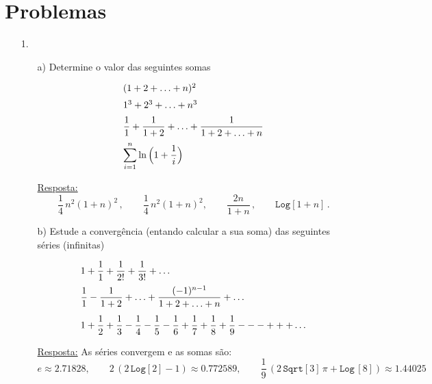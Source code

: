\documentclass[11pt]{article}
\begin{document}
  \section{Problemas}   
  \begin{itemize}
  
  \item[1.]       \begin{itemize}
  
  \item[a)]  Determine o valor das seguintes  somas 
  
  \[\begin{array}{l}
    (1+2+\ldots+n)^2\vspace{2mm}\\
    1^3+2^3+\ldots+n^3\vspace{2mm}\\
\displaystyle \frac{1}{1}+\frac{1}{1+2}+\ldots + \frac{1}{1+2+\ldots +n} 
\vspace{2mm}\\
\displaystyle  \sum_{i=1}^n \ln \Big( 1+\frac{1}{i}\Big)
\end{array}  \]

\underline{Resposta:}
\[
\frac{1}{4} \, n^2 (1 + n)^2\, , \qquad \frac{1}{4}\, n^2 (1 + n)^2, \qquad \frac{2 n}{1 + n}\, , \qquad  \texttt{Log}[1+n]\, .
\]


  \item[b)]   Estude a converg\^encia (entando calcular a sua soma) das seguintes s\'eries (infinitas)

  
  \[\begin{array}{l}
\displaystyle 1+ \frac{1}{1}+\frac{1}{2!}+\frac{1}{3!} + \ldots 
\vspace{2mm}\\

\displaystyle \frac{1}{1}-\frac{1}{1+2}+\ldots + \frac{(-1)^{n-1}}{1+2+\ldots +n} + \ldots 

\vspace{3mm}\\

\displaystyle 
1+\frac{1}{2}+\frac{1}{3}-\frac{1}{4}-\frac{1}{5}-\frac{1}{6}+\frac{1}{7}+\frac{1}{8}+\frac{1}{9} - - - + + + \ldots
\end{array}  \]

\underline{Resposta:} As s\'eries convergem e as somas s\~ao:
\[
e\approx 2.71828,\qquad 2\, (2\, \texttt{Log}[2]-1)\approx 0.772589,\qquad \frac{1}{9} \, (2\, \texttt{Sqrt}[3] \,\pi+ \texttt{Log} \,[8])\approx 1.44025
\]


\end{itemize}
\end{itemize}
\end{document}

